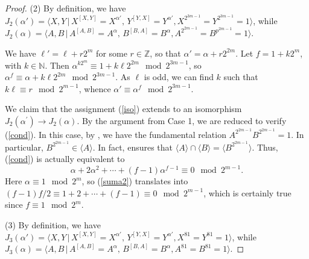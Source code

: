 \documentclass{amsart}
\theoremstyle{definition}
\theoremstyle{remark}
\newcommand \Z{{\mathbb Z}}
\newcommand \N{{\mathbb N}}
\begin{document}
\begin{proof}


(2) By definition, we have $J_2(\alpha')=\langle X,Y\,|\, X^{[X,Y]}=X^{\alpha'},\, Y^{[Y,X]}=Y^{\alpha'}, X^{2^{3m-1}}=Y^{2^{3m-1}}=1\rangle$,
while $J_2(\alpha)=\langle A,B\,|\, A^{[A,B]}=A^{\alpha},\, B^{[B,A]}=B^{\alpha}, A^{2^{2m-1}}=B^{p^{2m-1}}=1\rangle.$

We have $\ell'=\ell+r2^m$ for some $r\in\Z$, so that
$\alpha'=\alpha+r2^{2m}$. Let $f=1+k2^m$, with $k\in\N$. Then $\alpha^{k2^m} \equiv 1+k\ell 2^{2m}\mod 2^{3m-1}$, so
$\alpha^f \equiv \alpha+ k\ell 2^{2m}\mod 2^{3m-1}$. As $\ell$ is odd, we can find $k$ such that
$k\ell\equiv r\mod 2^{m-1}$, whence $\alpha'\equiv\alpha^f\mod 2^{3m-1}$.

We claim that the assignment (\ref{iso}) extends to an isomorphism $J_2(\alpha^\prime)\to J_2(\alpha)$.
By the argument from Case 1, we are reduced to verify (\ref{cond}). In this case, by \cite[Section 6]{MS},
we have the fundamental relation $A^{2^{2m-1}}B^{2^{2m-1}}=1$. In particular, $B^{2^{2m-1}}\in\langle A\rangle$.
In fact, \cite[Proposition 7.2]{MS} ensures that
$\langle A\rangle\cap \langle B\rangle= \langle B^{2^{2m-1}} \rangle$. Thus, (\ref{cond})
is actually equivalent to
\begin{equation}
\label{suma2}
\alpha+2\alpha^2+\cdots+(f-1)\alpha^{f-1}\equiv 0\mod 2^{m-1}.
\end{equation}
Here $\alpha\equiv 1\mod 2^m$, so (\ref{suma2}) translates into $(f-1)f/2\equiv 1+2+\cdots+(f-1)\equiv 0\mod 2^{m-1}$,
which is certainly true since $f\equiv 1\mod 2^m$.


(3) By definition, we have $J_3(\alpha')=\langle X,Y\,|\, X^{[X,Y]}=X^{\alpha'},\, Y^{[Y,X]}=Y^{\alpha'}, X^{81}=Y^{81}=1\rangle$,
while $J_3(\alpha)=\langle A,B\,|\, A^{[A,B]}=A^{\alpha},\, B^{[B,A]}=B^{\alpha}, A^{81}=B^{81}=1\rangle.$


\end{proof}
\end{document}
